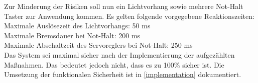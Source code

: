 \documentclass[../../../Bachelorarbeit.tex]{subfiles}
\begin{document}
Zur Minderung der Risiken soll nun ein Lichtvorhang sowie mehrere Not-Halt Taster zur Anwendung kommen. Es gelten folgende vorgegebene Reaktionszeiten:\\
\bigskip \newline
Maximale Auslösezeit des Lichtvorhangs: 50 \si{ms}\\
Maximale Bremsdauer bei Not-Halt: 200 \si{ms}\\
Maximale Abschaltzeit des Servoreglers bei Not-Halt: 250 \si{ms}\\

Das System sei maximal sicher nach der Implementierung der aufgezählten Maßnahmen. Das bedeutet jedoch nicht, dass es zu 100\% sicher ist. Die Umsetzung der funktionalen Sicherheit ist in \autoref{implementation} dokumentiert.

\end{document}
